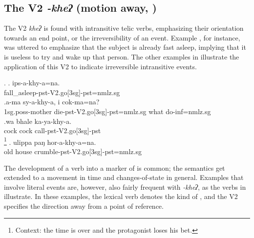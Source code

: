 \subsection{The V2 \emph{-kheʔ} (motion away, )}\label{V2-go}%

The V2 \emph{kheʔ}  is  found with intransitive telic verbs, emphasizing their orientation towards an end point, or the irreversibility of an event. Example \Next[a], for instance, was uttered to emphasize that the subject is already fast asleep, implying that it is useless to try and wake up that person. The other examples in \Next illustrate the application of this V2 to indicate irreversible intransitive events.

\ex. \ag.  ips-a-khy-a=na.\\
	  fall\_asleep{\sc -pst-V2.go[3sg]-pst=nmlz.sg}\\
\bg.a-ma sy-a-khy-a,                    i    cok-ma=na?\\
{\sc 1sg.poss-}mother die{\sc -pst-V2.go[3sg]-pst=nmlz.sg} what do{\sc -inf=nmlz.sg}\\
\bg.wa   bhale ka-ya-khy-a.\\
cock cock call{\sc -pst-V2.go[3sg]-pst}\\
\footnote{Context: the time is over and the protagonist loses his bet.} 
\bg. ulippa paŋ hor-a-khy-a=na.\\
	old house crumble{\sc -pst-V2.go[3sg]-pst=nmlz.sg}\\


The development of a  verb into a marker of  is common; the  semantics get extended to a movement in time and changes-of-state in general. Examples that involve literal  events are, however, also fairly frequent with \emph{-kheʔ}, as the verbs in \Next illustrate. In these examples, the lexical verb denotes the kind of , and the V2 specifies the direction away from a point of reference.

